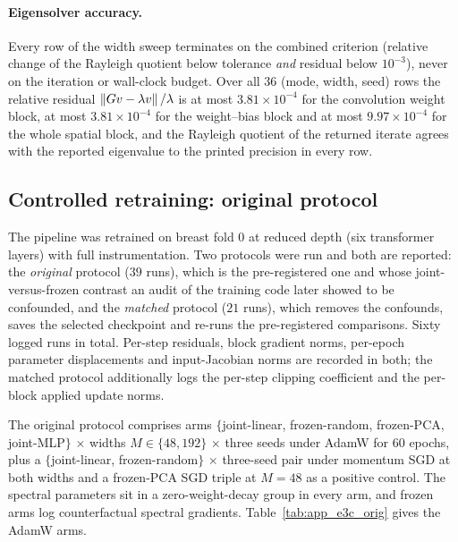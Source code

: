 \paragraph{Eigensolver accuracy.} Every row of the width sweep terminates on
the combined criterion (relative change of the Rayleigh quotient below
tolerance \emph{and} residual below $10^{-3}$), never on the iteration or
wall-clock budget. Over all $36$ (mode, width, seed) rows the relative residual
$\left\lVert Gv - \lambda v\right\rVert/\lambda$ is at most $3.81\times10^{-4}$ for the
convolution weight block, at most $3.81\times10^{-4}$ for the weight--bias
block and at most $9.97\times10^{-4}$ for the whole spatial block, and the
Rayleigh quotient of the returned iterate agrees with the reported eigenvalue
to the printed precision in every row.

\subsection{Controlled retraining: original protocol}
\label{app:prod_e3c}

The pipeline was retrained on breast fold $0$ at reduced depth (six transformer
layers) with full instrumentation. Two protocols were run and both are
reported: the \emph{original} protocol ($39$ runs), which is the pre-registered
one and whose joint-versus-frozen contrast an audit of the training code later
showed to be confounded, and the \emph{matched} protocol ($21$ runs), which
removes the confounds, saves the selected checkpoint and re-runs the
pre-registered comparisons. Sixty logged runs in total. Per-step residuals,
block gradient norms, per-epoch parameter displacements and input-Jacobian
norms are recorded in both; the matched protocol additionally logs the
per-step clipping coefficient and the per-block applied update norms.

The original protocol comprises arms $\{$joint-linear, frozen-random,
frozen-PCA, joint-MLP$\}$ $\times$ widths $M \in \{48, 192\}$ $\times$ three
seeds under AdamW for $60$ epochs, plus a $\{$joint-linear, frozen-random$\}$
$\times$ three-seed pair under momentum SGD at both widths and a frozen-PCA SGD
triple at $M = 48$ as a positive control. The spectral parameters sit in a
zero-weight-decay group in every arm, and frozen arms log counterfactual
spectral gradients. Table~\ref{tab:app_e3c_orig} gives the AdamW arms.

